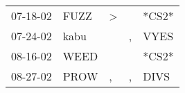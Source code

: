 \begin{supertabular}{p{0.07\textwidth}p{0.06\textwidth}p{0.02\textwidth}p{0.02\textwidth}p{0.06\textwidth}}
 07-18-02\textsuperscript{} &           FUZZ\textsuperscript{} &  \textgreater &               &                            *CS2* \\
 07-24-02\textsuperscript{} &           kabu\textsuperscript{} &               &             , &           VYES\textsuperscript{} \\
 08-16-02\textsuperscript{} &           WEED\textsuperscript{} &               &               &                            *CS2* \\
 08-27-02\textsuperscript{} &           PROW\textsuperscript{} &             , &             , &           DIVS\textsuperscript{} \\
\end{supertabular}
